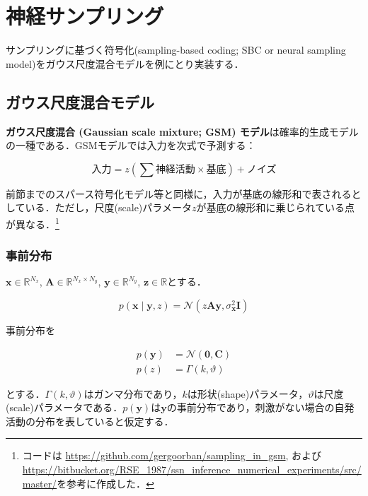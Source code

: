 \section{神経サンプリング}

サンプリングに基づく符号化(sampling-based coding; SBC or neural sampling model)をガウス尺度混合モデルを例にとり実装する．

\subsection{ガウス尺度混合モデル}
\textbf{ガウス尺度混合 (Gaussian scale mixture; GSM) モデル}は確率的生成モデルの一種である\citep{Wainwright1999-cl}\citep{Orban2016-tm}．GSMモデルでは入力を次式で予測する：


\begin{equation}
\text{入力}={z}\left(\sum \text{神経活動} \times \text{基底} \right) + \text{ノイズ}
\end{equation}


前節までのスパース符号化モデル等と同様に，入力が基底の線形和で表されるとしている．ただし，尺度(scale)パラメータ$z$が基底の線形和に乗じられている点が異なる．\footnote{コードは\citep{Orban2016-tm} \url{https://github.com/gergoorban/sampling_in_gsm}, および\citep{Echeveste2020-sh} \url{https://bitbucket.org/RSE_1987/ssn_inference_numerical_experiments/src/master/}を参考に作成した．}


\subsubsection{事前分布}
$\mathbf{x} \in \mathbb{R}^{N_x}$, $\mathbf{A} \in \mathbb{R}^{N_x\times N_y}$, $\mathbf{y} \in \mathbb{R}^{N_y}$, $\mathbf{z} \in \mathbb{R}$とする．


\begin{equation}
p\left(\mathbf{x}\mid\mathbf{y}, z\right)=\mathcal{N}\left(z \mathbf{A} \mathbf{y}, \sigma_{\mathbf{x}}^{2} \mathbf{I}\right)
\end{equation}


事前分布を


\begin{align}
p\left(\mathbf{y}\right)&=\mathcal{N}\left(\mathbf{0}, \mathbf{C}\right)\\
p\left(z\right)&=\Gamma (k, \vartheta)
\end{align}


とする．$\Gamma(k, \vartheta)$はガンマ分布であり，$k$は形状(shape)パラメータ，$\vartheta$は尺度(scale)パラメータである．$p\left(\mathbf{y}\right)$は$\mathbf{y}$の事前分布であり，刺激がない場合の自発活動の分布を表していると仮定する．
